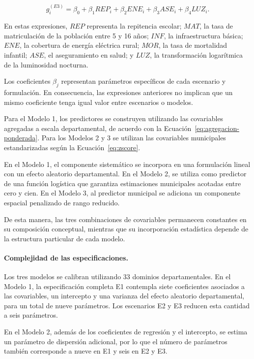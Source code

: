\begin{equation}
g_i^{(E3)}
= \beta_0
+ \beta_1 REP_i
+ \beta_2 ENE_i
+ \beta_3 ASE_i
+ \beta_4 LUZ_i.
\label{eq:escenario-e3}
\end{equation}

En estas expresiones, $REP$ representa la repitencia escolar; $MAT$, la tasa de matriculación de la población entre 5 y 16 años; $INF$, la infraestructura básica; $ENE$, la cobertura de energía eléctrica rural; $MOR$, la tasa de mortalidad infantil; $ASE$, el aseguramiento en salud; y $LUZ$, la transformación logarítmica de la luminosidad nocturna.

Los coeficientes $\beta_j$ representan parámetros específicos de cada escenario y formulación. En consecuencia, las expresiones anteriores no implican que un mismo coeficiente tenga igual valor entre escenarios o modelos.

Para el Modelo 1, los predictores se construyen utilizando las covariables agregadas a escala departamental, de acuerdo con la Ecuación~\ref{eq:agregacion-ponderada}. Para los Modelos 2 y 3 se utilizan las covariables municipales estandarizadas según la Ecuación~\ref{eq:zscore}.

En el Modelo 1, el componente sistemático se incorpora en una formulación lineal con un efecto aleatorio departamental. En el Modelo 2, se utiliza como predictor de una función logística que garantiza estimaciones municipales acotadas entre cero y cien. En el Modelo 3, al predictor municipal se adiciona un componente espacial penalizado de rango reducido.

De esta manera, las tres combinaciones de covariables permanecen constantes en su composición conceptual, mientras que su incorporación estadística depende de la estructura particular de cada modelo.

\paragraph{Complejidad de las especificaciones.}

Los tres modelos se calibran utilizando 33 dominios departamentales. En el Modelo 1, la especificación completa E1 contempla siete coeficientes asociados a las covariables, un intercepto y una varianza del efecto aleatorio departamental, para un total de nueve parámetros. Los escenarios E2 y E3 reducen esta cantidad a seis parámetros.

En el Modelo 2, además de los coeficientes de regresión y el intercepto, se estima un parámetro de dispersión adicional, por lo que el número de parámetros también corresponde a nueve en E1 y seis en E2 y E3.

